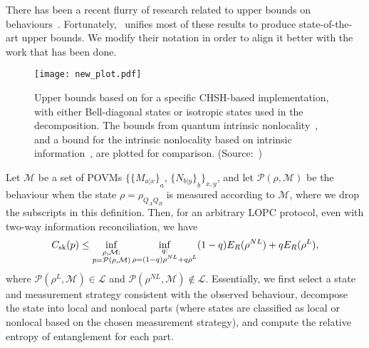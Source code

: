 \documentclass[10pt, a4paper]{article}
\numberwithin{equation}{section} %
\theoremstyle{definition}
\theoremstyle{plain}
\newcommand{\?}{\mathrel{?}} %
\newcommand{\sM}{\mathcal{M}}
\newcommand{\cP}{\mathcal{P}}
\newcommand{\Ls}{\mathcal{L}}
\newcommand{\sk}{\rm sk}
\begin{document}
      There has been a recent flurry of research related to upper bounds on behaviours~\cite{NotSufficient, RevisedPeres, DIQKD_QKD_Gap, CCSquashedEntangle, DIQKD_Limits}. Fortunately,~\cite{CCSquashedEntangle} unifies most of these results to produce state-of-the-art upper bounds. We modify their notation in order to align it better with the work that has been done.


      \begin{figure}
        \centering
        \texttt{[image: new\_plot.pdf]}
        \caption{\label{fig:genubound} Upper bounds based on  for a specific CHSH-based implementation, with either Bell-diagonal states or isotropic states used in the decomposition. The bounds from quantum intrinsic nonlocality~\cite{DIQKD_Limits}, and a bound for the intrinsic nonlocality based on intrinsic information~\cite[Appendix B]{RevisedPeres}, are plotted for comparison. (Source:~\cite{CCSquashedEntangle})}
      \end{figure}

      Let \(\sM\) be a set of POVMs \(\{{\{M_{a|x}\}}_{a}\), \({\{N_{b|y}\}}_{b}\}_{x,y}\), and let \(\cP(\rho, \sM)\) be the behaviour when the state \(\rho = \rho_{Q_A Q_B}\) is measured according to \(\sM\), where we drop the subscripts in this definition. Then, for an arbitrary LOPC protocol, even with two-way information reconciliation, we have~\cite[Thm. 3]{CCSquashedEntangle}
      \begin{equation}\label{eqn:genubound}
        C_{\sk}(p) \leq \inf_{\substack{\rho, \sM : \\ p = \cP(\rho, \sM) }} \inf_{\substack{q : \\ \rho = (1-q)\rho^{NL} + q\rho^L}} (1-q) E_R(\rho^{NL}) + q E_R(\rho^L),
      \end{equation}
      where \(\cP(\rho^L, \sM) \in \Ls\) and \(\cP(\rho^{NL}, \sM) \not\in \Ls\). Essentially, we first select a state and measurement strategy consistent with the observed behaviour, decompose the state into local and nonlocal parts (where states are classified as local or nonlocal based on the chosen measurement strategy), and compute the relative entropy of entanglement for each part.
\end{document}

